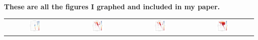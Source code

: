 \documentclass[12pt, a4paper]{article}
\begin{document}
        \pagebreak
\begin{center}
    \textbf{These are all the figures I graphed and included in my paper.} 
    \begin{tabular}{cccc}
        \includegraphics[width=0.22\textwidth]{figs/GeneratedFigs/V404_Cygni/LMXBsHRDiagram.png} &
        \includegraphics[width=0.22\textwidth]{figs/GeneratedFigs/V404_Cygni/V404EndStateDatasetPopulationHRComp.png} &
        \includegraphics[width=0.22\textwidth]{figs/GeneratedFigs/V404_Cygni/V404LMXBPopulationHRComp.png} &
        \includegraphics[width=0.22\textwidth]{figs/GeneratedFigs/V404_Cygni/V404EntireDatasetPopulationHRComp.png} \\
        

\end{tabular}
\end{center}
\end{document}
